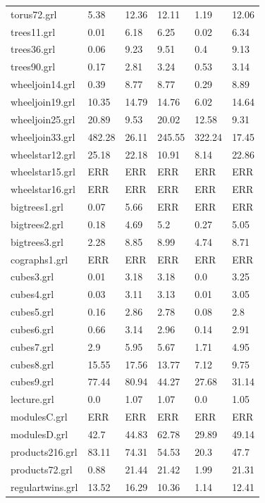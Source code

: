 \documentclass[11pt]{article}
\begin{document}
\begin{table}[h!]
\begin{tabularx}{\textwidth}{|l|X|X|X|X|X|}
		torus72.grl & 5.38 & 12.36 & 12.11 & 1.19 & 12.06 \\
		trees11.grl & 0.01 & 6.18 & 6.25 & 0.02 & 6.34 \\
		trees36.grl & 0.06 & 9.23 & 9.51 & 0.4 & 9.13 \\
		trees90.grl & 0.17 & 2.81 & 3.24 & 0.53 & 3.14 \\
		wheeljoin14.grl & 0.39 & 8.77 & 8.77 & 0.29 & 8.89 \\
		wheeljoin19.grl & 10.35 & 14.79 & 14.76 & 6.02 & 14.64 \\
		wheeljoin25.grl & 20.89 & 9.53 & 20.02 & 12.58 & 9.31 \\
		wheeljoin33.grl & 482.28 & 26.11 & 245.55 & 322.24 & 17.45 \\
		wheelstar12.grl & 25.18 & 22.18 & 10.91 & 8.14 & 22.86 \\
		wheelstar15.grl & ERR & ERR & ERR & ERR & ERR \\
		wheelstar16.grl & ERR & ERR & ERR & ERR & ERR \\
		bigtrees1.grl & 0.07 & 5.66 & ERR & ERR & ERR \\
		bigtrees2.grl & 0.18 & 4.69 & 5.2 & 0.27 & 5.05 \\
		bigtrees3.grl & 2.28 & 8.85 & 8.99 & 4.74 & 8.71 \\
		cographs1.grl & ERR & ERR & ERR & ERR & ERR \\
		cubes3.grl & 0.01 & 3.18 & 3.18 & 0.0 & 3.25 \\
		cubes4.grl & 0.03 & 3.11 & 3.13 & 0.01 & 3.05 \\
		cubes5.grl & 0.16 & 2.86 & 2.78 & 0.08 & 2.8 \\
		cubes6.grl & 0.66 & 3.14 & 2.96 & 0.14 & 2.91 \\
		cubes7.grl & 2.9 & 5.95 & 5.67 & 1.71 & 4.95 \\
		cubes8.grl & 15.55 & 17.56 & 13.77 & 7.12 & 9.75 \\
		cubes9.grl & 77.44 & 80.94 & 44.27 & 27.68 & 31.14 \\
		lecture.grl & 0.0 & 1.07 & 1.07 & 0.0 & 1.05 \\
		modulesC.grl & ERR & ERR & ERR & ERR & ERR \\
		modulesD.grl & 42.7 & 44.83 & 62.78 & 29.89 & 49.14 \\
		products216.grl & 83.11 & 74.31 & 54.53 & 20.3 & 47.7 \\
		products72.grl & 0.88 & 21.44 & 21.42 & 1.99 & 21.31 \\
		regulartwins.grl & 13.52 & 16.29 & 10.36 & 1.14 & 12.41 \\

\end{tabularx}
\end{table}
\end{document}
